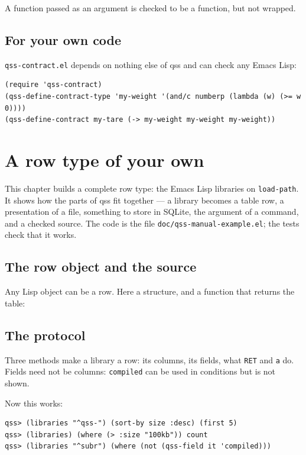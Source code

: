 \documentclass[
  paper=a4, fontsize=11pt, parskip=half, headings=small,
  toc=bibliography, numbers=noenddot, DIV=12
]{scrreprt}
\newcommand{\code}[1]{\texttt{#1}}
\newcommand{\file}[1]{\texttt{#1}}
\newcommand{\kbd}[1]{\texttt{#1}}
\newcommand{\qss}{\textsf{qss}}
\begin{document}
A function passed as an argument is checked to be a function, but not wrapped.

\section{For your own code}

\file{qss-contract.el} depends on nothing else of \qss{} and can check any Emacs
Lisp:

\begin{lstlisting}
(require 'qss-contract)
(qss-define-contract-type 'my-weight '(and/c numberp (lambda (w) (>= w 0))))
(qss-define-contract my-tare (-> my-weight my-weight my-weight))
\end{lstlisting}

\chapter{A row type of your own}\label{chap:own}

This chapter builds a complete row type: the Emacs Lisp libraries on
\code{load-path}. It shows how the parts of \qss{} fit together --- a library
becomes a table row, a presentation of a file, something to store in SQLite, the
argument of a command, and a checked source. The code is the file
\file{doc/qss-manual-example.el}; the tests check that it works.

\section{The row object and the source}

Any Lisp object can be a row. Here a structure, and a function that returns the
table:




\section{The protocol}

Three methods make a library a row: its columns, its fields, what \kbd{RET} and
\kbd{a} do. Fields need not be columns: \code{compiled} can be used in
conditions but is not shown.



Now this works:

\begin{Verbatim}
qss> (libraries "^qss-") (sort-by size :desc) (first 5)
qss> (libraries) (where (> :size "100kb")) count
qss> (libraries "^subr") (where (not (qss-field it 'compiled)))
\end{Verbatim}
\end{document}
